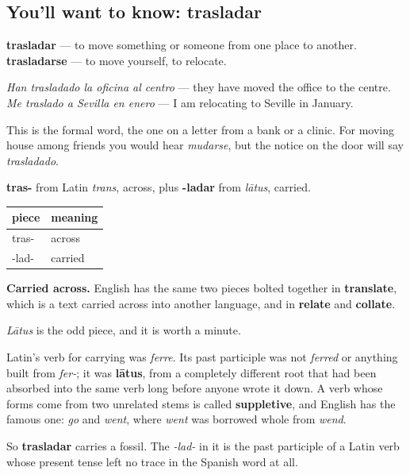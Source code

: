 \subsection*{You'll want to know: trasladar}
\textbf{trasladar} — to move something or someone from one place to another. \textbf{trasladarse} — to move yourself, to relocate.

\emph{Han trasladado la oficina al centro} — they have moved the office to the centre. \emph{Me traslado a Sevilla en enero} — I am relocating to Seville in January.

This is the formal word, the one on a letter from a bank or a clinic. For moving house among friends you would hear \emph{mudarse}, but the notice on the door will say \emph{trasladado}.

\begin{cousinweb}
\textbf{tras-} from Latin \emph{trans}, across, plus \textbf{-ladar} from \emph{lātus}, carried.

\noindent
\begin{tabularx}{\linewidth}{@{}>{\raggedright\arraybackslash}X>{\raggedright\arraybackslash}X@{}}
\toprule
\textbf{piece} & \textbf{meaning} \\
\midrule
tras- & across \\
-lad- & carried \\
\bottomrule
\end{tabularx}

\textbf{Carried across.} English has the same two pieces bolted together in \textbf{translate}, which is a text carried across into another language, and in \textbf{relate} and \textbf{collate}.
\end{cousinweb}

\begin{culture}
\emph{Lātus} is the odd piece, and it is worth a minute.

Latin's verb for carrying was \emph{ferre}. Its past participle was not \emph{ferred} or anything built from \emph{fer-}; it was \textbf{lātus}, from a completely different root that had been absorbed into the same verb long before anyone wrote it down. A verb whose forms come from two unrelated stems is called \textbf{suppletive}, and English has the famous one: \emph{go} and \emph{went}, where \emph{went} was borrowed whole from \emph{wend}.

So \textbf{trasladar} carries a fossil. The \emph{-lad-} in it is the past participle of a Latin verb whose present tense left no trace in the Spanish word at all.
\end{culture}


